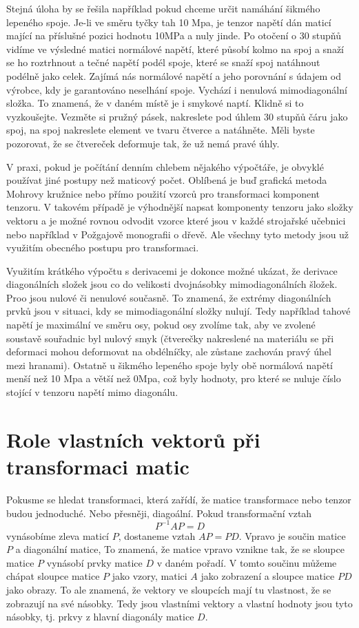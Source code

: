 \documentclass[12pt]{article}
\begin{document}
Stejná úloha by se řešila například pokud chceme určit namáhání šikmého lepeného spoje. Je-li ve směru tyčky tah 10 Mpa, je tenzor napětí dán maticí mající na příslušné pozici hodnotu 10MPa a nuly jinde. Po otočení o 30 stupňů vidíme ve výsledné matici normálové napětí, které působí kolmo na spoj a snaží se ho roztrhnout a tečné napětí podél spoje, které se snaží spoj natáhnout podélně jako celek. Zajímá nás normálové napětí a jeho porovnání s údajem od výrobce, kdy je garantováno neselhání spoje. Vychází i nenulová mimodiagonální složka. To znamená, že v daném místě je i smykové naptí. Klidně si to vyzkoušejte. Vezměte si pružný pásek, nakreslete pod úhlem 30 stupňů čáru jako spoj, na spoj nakreslete element ve tvaru čtverce a natáhněte. Měli byste pozorovat, že se čtvereček deformuje tak, že už nemá pravé úhly. 

V praxi, pokud je počítání denním chlebem nějakého výpočtáře, je obvyklé používat jiné postupy než maticový počet. Oblíbená je buď grafická metoda Mohrovy kružnice nebo přímo použití vzorců pro transformaci komponent tenzoru. V takovém případě je výhodnější napsat komponenty tenzoru jako složky vektoru a je možné rovnou odvodit vzorce které jsou v každé strojařské učebnici nebo například v Požgajově monografii o dřevě. Ale všechny tyto metody jsou už využitím obecného postupu pro transformaci. 

Využitím krátkého výpočtu s derivacemi je dokonce možné ukázat, že derivace diagonálních složek jsou co do velikosti dvojnásobky mimodiagonálních šložek. Proo jsou nulové či nenulové současně. To znamená, že extrémy diagonálních prvků jsou v situaci, kdy se mimodiagonální složky nulují. Tedy například tahové napětí je maximální ve směru osy, pokud osy zvolíme tak, aby ve zvolené soustavě souřadnic byl nulový smyk (čtverečky nakreslené na materiálu se při deformaci mohou deformovat na obdélníčky, ale zůstane zachován pravý úhel mezi hranami). Ostatně u šikmého lepeného spoje byly obě normálová napětí menší než 10 Mpa a větší než 0Mpa, což byly hodnoty, pro které se nuluje číslo stojící v tenzoru napětí mimo diagonálu.


\section{Role vlastních vektorů při transformaci matic}

Pokusme se hledat transformaci, která zařídí, že matice transformace nebo tenzor budou jednoduché. Nebo přesněji, diagoální. Pokud transformační vztah $$P^{-1}AP=D$$ vynásobíme zleva maticí $P$, dostaneme vztah $AP=PD$. Vpravo je součin matice $P$ a diagonální matice, To znamená, že matice vpravo vznikne tak, že se sloupce matice $P$ vynásobí prvky matice $D$ v daném pořadí. V tomto součinu můžeme chápat sloupce matice $P$ jako vzory, matici $A$ jako zobrazení a sloupce matice $PD$ jako obrazy. To ale znamená, že vektory ve sloupcích mají tu vlastnost, že se zobrazují na své násobky. Tedy jsou vlastními vektory a vlastní hodnoty jsou tyto násobky, tj. prkvy z hlavní diagonály matice $D$.
\end{document}
